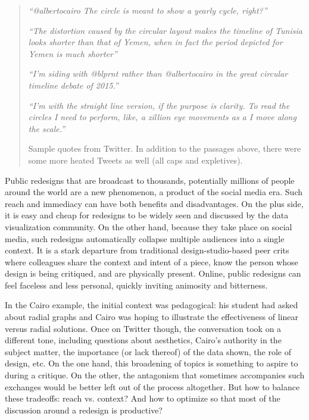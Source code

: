 \documentclass[sigconf,nonacm,screen,pbalance]{acmart}
\begin{document}
\begin{quotation}
    {\em ``@albertocairo The circle is meant to show a
    yearly cycle, right?''}
    
    {\em ``The distortion caused by the circular
    layout makes the timeline of Tunisia looks shorter than that of Yemen, when in fact
    the period depicted for Yemen is much shorter''}
    
    {\em ``I'm siding with @blprnt rather than
    @albertocairo in the great circular timeline debate of 2015.''}
    
    {\em ``I'm with the straight line version, if the
    purpose is clarity. To read the circles I need to perform, like, a zillion eye
    movements as a I move along the scale.''}
    
    Sample quotes from Twitter. In addition to the passages
    above, there were some more heated Tweets as well (all caps and expletives).
\end{quotation}

Public redesigns that are broadcast to thousands, potentially
millions of people around the world are a new phenomenon, a product of the social media
era. Such reach and immediacy can have both benefits and disadvantages. On the plus side,
it is easy and cheap for redesigns to be widely seen and discussed by the data
visualization community. On the other hand, because they take place on social media, such
redesigns automatically collapse multiple audiences into a single context. It is a stark
departure from traditional design-studio-based peer crits where colleagues share the
context and intent of a piece, know the person whose design is being critiqued, and are
physically present. Online, public redesigns can feel faceless and less personal, quickly
inviting animosity and bitterness.

In the Cairo example, the initial context was pedagogical:
his student had asked about radial graphs and Cairo was hoping to illustrate the
effectiveness of linear versus radial solutions. Once on Twitter though, the conversation
took on a different tone, including questions about aesthetics, Cairo's authority in the
subject matter, the importance (or lack thereof) of the data shown, the role of design,
etc. On the one hand, this broadening of topics is something to aspire to during a
critique. On the other, the antagonism that sometimes accompanies such exchanges would be
better left out of the process altogether. But how to balance these tradeoffs: reach vs.
context? And how to optimize so that most of the discussion around a redesign is
productive?
\end{document}

